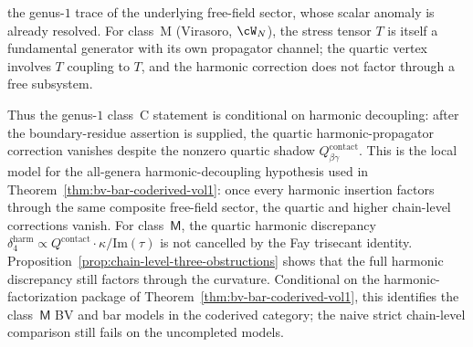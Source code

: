 \begin{remark}
\begin{enumerate}[label=\textup{(\roman*)},nosep]
 the genus-$1$ trace of the underlying free-field sector, whose scalar
 anomaly is already resolved.
 For class~M (Virasoro, $\cW_N$), the stress tensor $T$ is
 itself a fundamental generator with its own propagator channel;
 the quartic vertex involves $T$ coupling to $T$, and the
 harmonic correction does not factor through a free subsystem.
\end{enumerate}
Thus the genus-$1$ class~C statement is conditional on harmonic
decoupling: after the boundary-residue assertion is supplied, the
quartic harmonic-propagator correction vanishes despite the nonzero
quartic shadow $Q^{\mathrm{contact}}_{\beta\gamma}$. This is the local
model for the all-genera harmonic-decoupling hypothesis used in
Theorem~\ref{thm:bv-bar-coderived-vol1}: once every harmonic insertion
factors through the same composite free-field sector, the quartic and
higher chain-level corrections vanish. For class~$\mathsf{M}$, the
quartic harmonic discrepancy
$\delta_4^{\mathrm{harm}} \propto Q^{\mathrm{contact}} \cdot
\kappa / \mathrm{Im}(\tau)$ is not cancelled by the Fay trisecant
identity. Proposition~\ref{prop:chain-level-three-obstructions}
shows that the full harmonic discrepancy still factors through the
curvature. Conditional on the harmonic-factorization package of
Theorem~\ref{thm:bv-bar-coderived-vol1}, this identifies the
class~$\mathsf{M}$ BV and bar models in the coderived category;
the naive strict chain-level comparison still fails on the
uncompleted models.
\end{remark}

